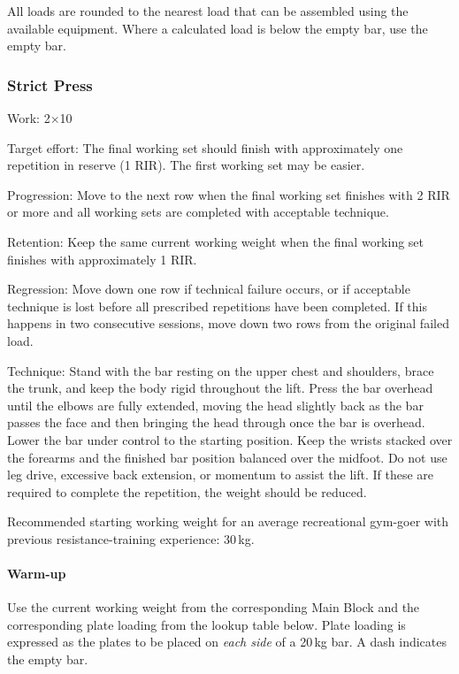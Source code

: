\documentclass[11pt,a4paper]{article}
\begin{document}
All loads are rounded to the nearest load that can be assembled using the available equipment. Where a calculated load is below the empty bar, use the empty bar.

\newpage
\subsubsection{Strict Press}

Work: 2$\times$10

Target effort: The final working set should finish with approximately one repetition in reserve (1 RIR). The first working set may be easier.

Progression: Move to the next row when the final working set finishes with 2 RIR or more and all working sets are completed with acceptable technique.

Retention: Keep the same current working weight when the final working set finishes with approximately 1 RIR.

Regression: Move down one row if technical failure occurs, or if acceptable technique is lost before all prescribed repetitions have been completed. If this happens in two consecutive sessions, move down two rows from the original failed load.

Technique: Stand with the bar resting on the upper chest and shoulders, brace the trunk, and keep the body rigid throughout the lift. Press the bar overhead until the elbows are fully extended, moving the head slightly back as the bar passes the face and then bringing the head through once the bar is overhead. Lower the bar under control to the starting position. Keep the wrists stacked over the forearms and the finished bar position balanced over the midfoot. Do not use leg drive, excessive back extension, or momentum to assist the lift. If these are required to complete the repetition, the weight should be reduced.

Recommended starting working weight for an average recreational gym-goer with previous resistance-training experience: 30\,kg.

\paragraph{Warm-up}

Use the current working weight from the corresponding Main Block and the corresponding plate loading from the lookup table below. Plate loading is expressed as the plates to be placed on \emph{each side} of a 20\,kg bar. A dash indicates the empty bar.
\end{document}

